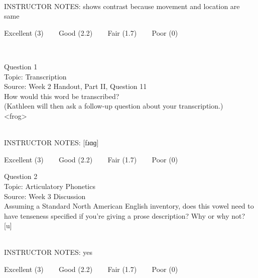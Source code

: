 \documentclass[12pt]{article}
\begin{document}
~\\
INSTRUCTOR NOTES: shows contrast because movement and location are same


\vfill
Excellent (3) ~~~ Good (2.2) ~~~ Fair (1.7) ~~~ Poor (0)
\newpage

\begin{center}
\textbf{{\color{red}{\HUGE END OF EXAM}}}\\

\end{center}
\newpage

\begin{center}
\textbf{{\color{blue}{\HUGE START OF EXAM\\}}}

\textbf{{\color{blue}{\HUGE Student ID: 80815\\}}}

\textbf{{\color{blue}{\HUGE \\}}}

\end{center}
\newpage

{\large Question 1}\\

Topic: Transcription\\
Source: Week 2 Handout, Part II, Question 11\\

How would this word be transcribed?\\ (Kathleen will then ask a follow-up question about your transcription.)\\

<frog>


~\\
INSTRUCTOR NOTES: [fɹɑɡ]


\vfill
Excellent (3) ~~~ Good (2.2) ~~~ Fair (1.7) ~~~ Poor (0)
\newpage

{\large Question 2}\\

Topic: Articulatory Phonetics\\
Source: Week 3 Discussion\\

Assuming a Standard North American English inventory, does this vowel need to have tenseness specified if you're giving a prose description? Why or why not?\\

{[u]}


~\\
INSTRUCTOR NOTES: yes


\vfill
Excellent (3) ~~~ Good (2.2) ~~~ Fair (1.7) ~~~ Poor (0)
\newpage
\end{document}

